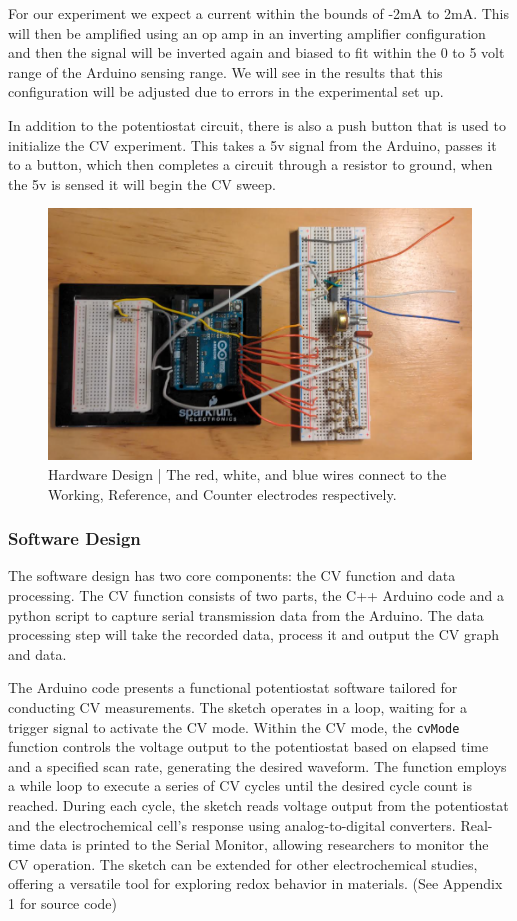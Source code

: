 \documentclass{article}
\begin{document}
For our experiment we expect a current within the bounds of -2mA to 2mA. This will then be amplified using an op amp in an inverting amplifier configuration and then the signal will be inverted again and biased to fit within the 0 to 5 volt range of the Arduino sensing range. We will see in the results that this configuration will be adjusted due to errors in the experimental set up.


In addition to the potentiostat circuit, there is also a push button that is used to initialize the CV experiment. This takes a 5v signal from the Arduino, passes it to a button, which then completes a circuit through a resistor to ground, when the 5v is sensed it will begin the CV sweep.


\begin{figure}[H]
\centering
\includegraphics[width=.9\linewidth]{hardware_design.png}
\caption{Hardware Design | The red, white, and blue wires connect to the Working, Reference, and Counter electrodes respectively.}
\end{figure}


\subsubsection*{Software Design}


The software design has two core components: the CV function and data processing. The CV function consists of two parts, the C++ Arduino code and a python script to capture serial transmission data from the Arduino. The data processing step will take the recorded data, process it and output the CV graph and data.


The Arduino code presents a functional potentiostat software tailored for conducting CV measurements. The sketch operates in a loop, waiting for a trigger signal to activate the CV mode. Within the CV mode, the \texttt{cvMode} function controls the voltage output to the potentiostat based on elapsed time and a specified scan rate, generating the desired waveform. The function employs a while loop to execute a series of CV cycles until the desired cycle count is reached. During each cycle, the sketch reads voltage output from the potentiostat and the electrochemical cell's response using analog-to-digital converters. Real-time data is printed to the Serial Monitor, allowing researchers to monitor the CV operation. The sketch can be extended for other electrochemical studies, offering a versatile tool for exploring redox behavior in materials. (See Appendix 1 for source code)
\end{document}
